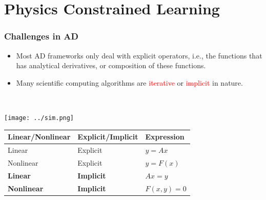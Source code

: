 \documentclass{beamer}
\begin{document}


\section{Physics Constrained Learning}
\begin{frame}


	\frametitle{Challenges in AD}
	
	
	\begin{minipage}[t]{0.49\textwidth}
	\vspace{-3cm}
\begin{itemize}
	\item Most AD frameworks only deal with explicit operators, i.e., the functions that has analytical derivatives, or composition of these functions. 
	\item Many scientific computing algorithms are \textcolor{red}{iterative} or \textcolor{red}{implicit} in nature.
\end{itemize}
\end{minipage}~
\begin{minipage}[t]{0.49\textwidth}
  \texttt{[image: ../sim.png]}
\end{minipage}

\begin{table}[]
\begin{tabular}{@{}lll@{}}
\toprule
Linear/Nonlinear & Explicit/Implicit & Expression   \\ \midrule
Linear           & Explicit          & $y=Ax$       \\
Nonlinear        & Explicit          & $y = F(x)$   \\
\textbf{Linear}           & \textbf{Implicit}          & $Ax = y$     \\
\textbf{Nonlinear}        & \textbf{Implicit}          & $F(x,y) = 0$ \\ \bottomrule
\end{tabular}
\end{table}
\end{frame}
\end{document}
